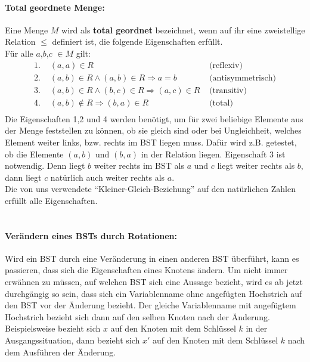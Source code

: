 \documentclass[a4paper,12pt]{article}
\begin{document}
\paragraph{Total geordnete Menge:} 
Eine Menge $M$ wird als \textbf{total geordnet} bezeichnet, wenn auf ihr eine zweistellige Relation $\leq$ definiert ist, die folgende Eigenschaften erfüllt.\\
Für alle $a$,$b$,$c$ $\in M$ gilt:
\begin{align*}
\text{1. } & (a,a) \in R  &\text{  (reflexiv)}\\
\text{2. } & (a,b) \in R  \land  (a,b) \in R \Rightarrow a = b  &\text{  (antisymmetrisch)}\\
\text{3. } & (a,b) \in R  \land  (b,c) \in R \Rightarrow  (a,c) \in R  &\text{  (transitiv)}\\
\text{4. } & (a,b) \notin R \Rightarrow  (b,a) \in R   &\text{  (total)}\\
\end{align*}
Die Eigenschaften 1,2 und 4 werden benötigt, um für zwei beliebige Elemente aus der Menge feststellen zu können, ob sie gleich sind oder bei Ungleichheit, welches Element weiter links, bzw. rechts im BST liegen muss. Dafür wird z.B. getestet, ob die Elemente $(a,b)$ und $(b, a)$ in der Relation liegen. Eigenschaft 3 ist notwendig. Denn liegt $b$ weiter rechts im BST als $a$ und $c$ liegt weiter rechts als $b$, dann liegt $c$ natürlich auch weiter rechts als $a$. \\
Die von uns verwendete \enquote{Kleiner-Gleich-Beziehung} auf den natürlichen Zahlen erfüllt alle Eigenschaften.
\\
\\




\paragraph{Verändern eines BSTs durch Rotationen:}
Wird ein BST durch eine Veränderung in einen anderen BST überführt, kann es passieren, dass sich die Eigenschaften eines Knotens ändern. Um nicht immer erwähnen zu müssen, auf welchen BST sich eine Aussage bezieht, wird es ab jetzt durchgängig so sein, dass sich ein Variablenname ohne angefügten Hochstrich auf den BST vor der Änderung bezieht. Der gleiche Variablenname mit angefügtem Hochstrich bezieht sich dann auf den selben Knoten nach der Änderung. Beispielsweise bezieht sich $x$ auf den Knoten mit dem Schlüssel $k$ in der Ausgangssituation, dann bezieht sich $x'$ auf den Knoten mit dem Schlüssel $k$ nach dem Ausführen der Änderung. \\
\end{document}
